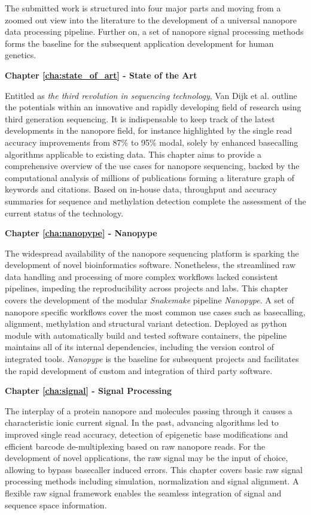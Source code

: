 The submitted work is structured into four major parts and moving from a zoomed out view into the literature to the development of a universal nanopore data processing pipeline. 
Further on, a set of nanopore signal processing methods forms the baseline for the subsequent application development for human genetics.

\textbf{Chapter \ref{cha:state_of_art} - State of the Art} %

Entitled as \textit{the third revolution in sequencing technology}, Van Dijk et al. \cite{Dijk2018} outline the potentials within an innovative and rapidly developing field of research using third generation sequencing.
It is indispensable to keep track of the latest developments in the nanopore field, for instance highlighted by the single read accuracy improvements from 87\% to 95\% modal, solely by enhanced basecalling algorithms applicable to existing data.
This chapter aims to provide a comprehensive overview of the use cases for nanopore sequencing, backed by the computational analysis of millions of publications forming a literature graph of keywords and citations.
Based on in-house data, throughput and accuracy summaries for sequence and methylation detection complete the assessment of the current status of the technology.


\textbf{Chapter \ref{cha:nanopype} - Nanopype}

The widespread availability of the nanopore sequencing platform is sparking the development of novel bioinformatics software.
Nonetheless, the streamlined raw data handling and processing of more complex workflows lacked consistent pipelines, impeding the reproducibility across projects and labs.
This chapter covers the development of the modular \textit{Snakemake} pipeline \textit{Nanopype}.
A set of nanopore specific workflows cover the most common use cases such as basecalling, alignment, methylation and structural variant detection.
Deployed as python module with automatically build and tested software containers, the pipeline maintains all of its internal dependencies, including the version control of integrated tools.
\textit{Nanopype} is the baseline for subsequent projects and facilitates the rapid development of custom and integration of third party software.


\textbf{Chapter \ref{cha:signal} - Signal Processing}

The interplay of a protein nanopore and molecules passing through it causes a characteristic ionic current signal.
In the past, advancing algorithms led to improved single read accuracy, detection of epigenetic base modifications and efficient barcode de-multiplexing based on raw nanopore reads.
For the development of novel applications, the raw signal may be the input of choice, allowing to bypass basecaller induced errors.
This chapter covers basic raw signal processing methods including simulation, normalization and signal alignment.
A flexible raw signal framework enables the seamless integration of signal and sequence space information.
 


